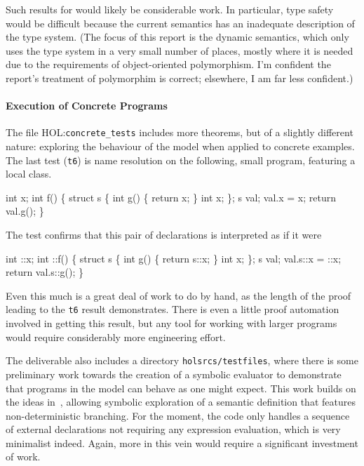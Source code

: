\documentclass[11pt]{article}
\newcommand{\HOLfile}[1]{HOL:\texttt{#1}}
\begin{document}
Such results for \cpp{} would likely be considerable work.  In
particular, type safety would be difficult because the current
semantics has an inadequate description of the type system. (The focus
of this report is the dynamic semantics, which only uses the type
system in a very small number of places, mostly where it is needed due
to the requirements of object-oriented polymorphism.  I'm confident
the report's treatment of polymorphim is correct; elsewhere, I am far
less confident.)

\paragraph{Execution of Concrete Programs}
The file \HOLfile{concrete_tests} includes more theorems, but of a
slightly different nature: exploring the behaviour of the model when
applied to concrete examples.   The
last test (\texttt{t6}) is name resolution on the following, small
program, featuring a local class.
\begin{stdrule}
   int x;
   int f()
   \{
     struct s \{
       int g() \{ return x; \}
       int x;
     \};
     s val;
     val.x = x;
     return val.g();
   \}
\end{stdrule}
The test confirms that this pair of declarations is interpreted as if
it were
\begin{stdrule}
   int ::x;
   int ::f()
   \{
     struct s \{
       int g() \{ return s::x; \}
       int x;
     \};
     s val;
     val.s::x = ::x;
     return val.s::g();
   \}
\end{stdrule}
Even this much is a great deal of work to do by hand, as the length of
the proof leading to the \texttt{t6} result demonstrates.  There is
even a little proof automation involved in getting this result, but
any tool for working with larger programs would require considerably
more engineering effort.

The deliverable also includes a directory \texttt{holsrcs/testfiles},
where there is some preliminary work towards the creation of a
symbolic evaluator to demonstrate that programs in the model can
behave as one might expect.  This work builds on the ideas
in~\cite{netsem:popl2006}, allowing symbolic exploration of a semantic
definition that features non-deterministic branching.  For the moment,
the code only handles a sequence of external declarations not
requiring any expression evaluation, which is very minimalist indeed.
Again, more in this vein would require a significant investment of
work.
\end{document}
